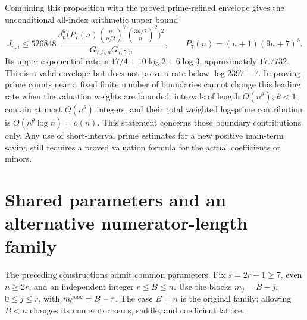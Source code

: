 \documentclass[11pt]{article}
\theoremstyle{remark}
\begin{document}
Combining this proposition with the proved prime-refined envelope gives
the unconditional all-index arithmetic upper bound
\[
 J_{n,i}\le526848\,
 \frac{d_n^6\bigl(P_7(n)\binom n{n/2}^7\binom{3n/2}n^2\bigr)^2}
 {G_{7,3,n}G_{7,5,n}},\qquad P_7(n)=(n+1)(9n+7)^6.
\]
Its upper exponential rate is
\(17/4+10\log2+6\log3\), approximately \(17.7732\).
This is a valid envelope but does not prove a rate below
\(\log2397-7\). Improving prime counts near a fixed finite number of
boundaries cannot change this leading rate when the valuation weights
are bounded: intervals of length \(O(n^\theta)\), \(\theta<1\),
contain at most \(O(n^\theta)\) integers, and their total weighted
log-prime contribution is \(O(n^\theta\log n)=o(n)\).
This statement concerns those boundary contributions only. Any use of
short-interval prime estimates for a new positive main-term saving still
requires a proved valuation formula for the actual coefficients or minors.

\section{Shared parameters and an alternative numerator-length family}
\label{sec:parametric-profiles}
The preceding constructions admit common parameters. Fix \(s=2r+1\ge7\),
even \(n\ge2r\), and an independent integer \(r\le B\le n\).
Use the blocks \(m_j=B-j\), \(0\le j\le r\), with \(m_0^{\rm base}=B-r\).
The case \(B=n\) is the original family; allowing \(B<n\) changes its
numerator zeros, saddle, and coefficient lattice.
\end{document}
